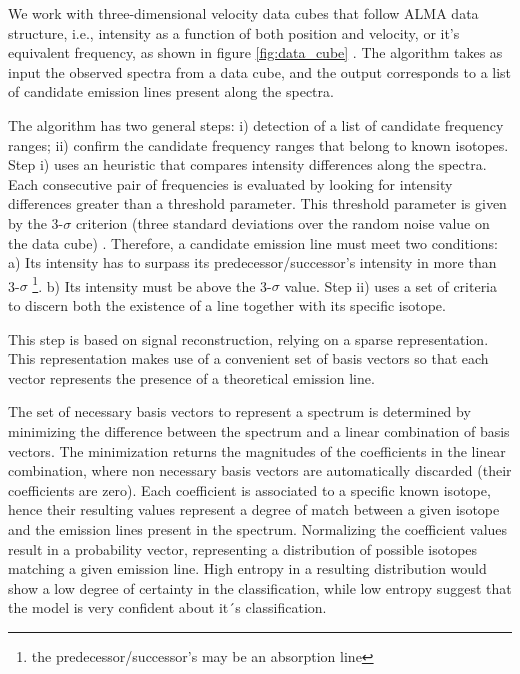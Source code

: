 We work with three-dimensional velocity data cubes that follow ALMA data structure, i.e., intensity as a function of both position and velocity, or it's equivalent frequency, as shown in figure \ref{fig:data_cube} \citep{eguchi_superluminal_2013}. The algorithm takes as input the observed spectra from a data cube, and the output corresponds to a list of candidate emission lines present along the spectra.

The algorithm has two general steps: i) detection of a list of candidate frequency ranges; ii) confirm the candidate frequency ranges that belong to known isotopes. Step i) uses an heuristic that compares intensity differences along the spectra.
Each consecutive pair of frequencies is evaluated by looking for intensity differences greater than a threshold parameter.
This threshold parameter is given by the 3-$\sigma$ criterion (three standard deviations over the random noise value on the data cube) \citep{sharpee_introducing_2003}.
Therefore, a candidate emission line must meet two conditions:
a) Its intensity has to surpass its predecessor/successor's intensity in more than 3-$\sigma$ \footnote{the predecessor/successor's may be an absorption line}.
b) Its intensity must be above the 3-$\sigma$ value.
Step ii) uses a set of criteria to discern both the existence of a line together with its specific isotope. 

This step is based on signal reconstruction, relying on a sparse representation. This representation makes use of a convenient set of basis vectors so that each 
vector represents the presence of a theoretical emission line.

The set of necessary basis vectors to represent a spectrum is determined by minimizing the difference between the spectrum and a linear combination of basis vectors. The minimization
returns the magnitudes of the coefficients in the linear combination, where non necessary basis vectors are automatically discarded (their coefficients are zero).
Each coefficient is associated to a specific known isotope, hence their resulting values represent a degree of match between a given isotope and the emission lines present in the spectrum.
Normalizing the coefficient values result in a probability vector, representing a distribution of possible isotopes matching a given emission line.
High entropy in a resulting distribution would show a low degree of certainty in the classification, while low entropy suggest that the model is very confident about it´s classification.

